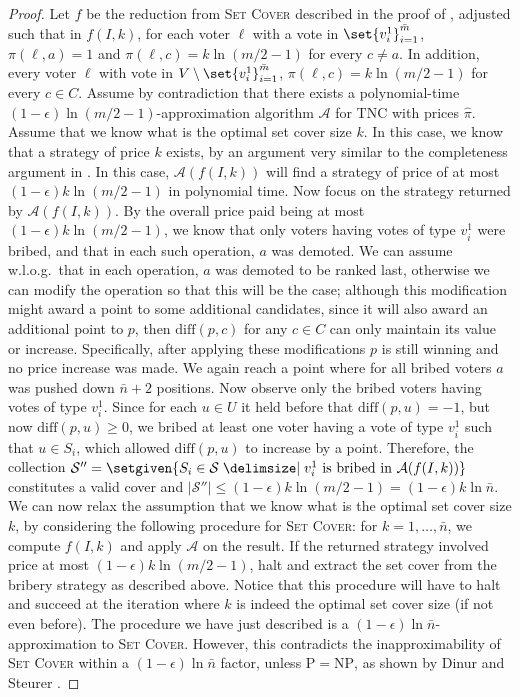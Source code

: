 \documentclass[letterpaper]{article} %
\newcommand{\SC}{\textsc{Set Cover}}
\newcommand{\SB}{\textsc{TNC}}
\newcommand{\abs}[1]{\lvert{#1}\rvert}
\newcommand{\diff}{\mathrm{diff}}
\newcommand{\NP}{\mathrm{NP}}
\newcommand{\Pclass}{\mathrm{P}}
\begin{document}
\begin{proof}
Let $f$ be the reduction from \SC{} described in the proof of  , adjusted such that in $f(I,k)$,  for each voter $\ell$ with a vote in $\set{v_i^1}_{i=1}^{\bar{m}}$,  $\pi(\ell,a) = 1$ and $\pi(\ell,c) = k\ln (m/2-1)$ for every $c \neq a$. In addition, every voter $\ell$ with vote in $V \setminus \set{v_i^1}_{i=1}^{\bar{m}}$,  $\pi(\ell,c) = k\ln (m/2-1)$ for every $c \in C$.
Assume by contradiction that there exists a polynomial-time $(1-\epsilon) \ln (m/2-1)$-approximation algorithm $\mathcal{A}$ for \SB{} with prices $\hat{\pi}$.
Assume that we know what is the optimal set cover size $k$.
In this case, we know that a strategy of price $k$ exists, by an argument very similar to the completeness argument in . %
In this case, $\mathcal{A}(f(I,k))$ will find a strategy of price of at most $(1-\epsilon) k \ln (m/2-1)$ in polynomial time.
Now focus on the strategy returned by $\mathcal{A}(f(I,k))$. By the overall price paid being at most  $ (1-\epsilon) k\ln (m/2-1)$, we know that only voters having votes of type $v_i^1$ were bribed, and that in each such operation, $a$ was demoted. We can assume w.l.o.g.\ that in each operation, $a$ was demoted  to be ranked last, otherwise we can modify the operation so that this will be the case; although this modification might award a point to some additional candidates, since it will also award an additional point to $p$, then $\diff(p,c)$ for any $c \in C$ can only maintain its value or increase. Specifically, after applying these modifications $p$ is still winning and no price increase was made.
We again reach a point where for all bribed voters  $a$ was pushed down $\bar{n}+2$ positions. Now observe only the bribed voters having votes of type $v_i^1$. Since  for each $u \in U$ it held before that $\diff(p, u) = -1$, but now $\diff(p, u) \geq 0$, we bribed at least one voter having a vote of type $v_i^1$ such that $u \in S_i$, which allowed $\diff(p, u)$ to increase by a point. Therefore, the collection $\mathcal{S}'' = \setgiven{S_i \in \mathcal{S} \given v_i^1 \text{ is bribed in } \mathcal{A}(f(I,k))}$ constitutes a valid cover and  $\abs{\mathcal{S}''} \leq (1-\epsilon) k \ln (m/2-1) = (1-\epsilon) k \ln \bar{n}$.
We can now relax the assumption that we know what is the optimal set cover size $k$, by considering the following procedure for \SC{}: for $k=1,\ldots,\bar{n}$, we compute $f(I,k)$ and apply  $\mathcal{A}$ on the result. If the returned strategy involved price at most  $ (1-\epsilon) k\ln (m/2-1)$, halt and extract the set cover from the bribery strategy as described above. Notice that this procedure will have to halt and succeed at the iteration where $k$ is indeed the optimal set cover size (if not even before). The procedure we have just described is a  $(1-\epsilon) \ln \bar{n}$-approximation to \SC{}.
However,  this contradicts the inapproximability of \SC{} within a $(1-\epsilon) \ln \bar{n}$ factor, unless $\Pclass = \NP$, as shown by Dinur and Steurer .
\end{proof}
\end{document}
